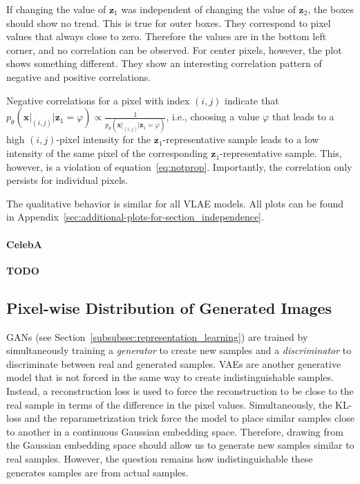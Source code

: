 If changing the value of $\bm{z}_1$ was independent of changing the value of $\bm{z}_2$, the boxes should show no trend.
This is true for outer boxes.
They correspond to pixel values that always close to zero.
Therefore the values are in the bottom left corner, and no correlation can be observed.
For center pixels, however, the plot shows something different.
They show an interesting correlation pattern of negative and positive correlations.

Negative correlations for a pixel with index $(i,j)$ indicate that $p_\theta(\bm{x}\big|_{(i,j)} | \bm{z}_1 = \varphi) \propto \frac{1}{p_\theta(\bm{x}\big|_{(i,j)} | \bm{z}_1 = \varphi)}$, i.e., choosing a value $\varphi$ that leads to a high $(i,j)$-pixel intensity for the $\bm{z}_1$-representative sample leads to a low intensity of the same pixel of the corresponding $\bm{z}_1$-representative sample.
This, however, is a violation of equation~\ref{eq:notprop}.
Importantly, the correlation only persists for individual pixels.

The qualitative behavior is similar for all \ac{VLAE} models.
All plots can be found in Appendix~\ref{sec:additional-plots-for-section_independence}.

\paragraph{CelebA}

\textbf{TODO}

\subsection{Pixel-wise Distribution of Generated Images}\label{subsubsec:pixel_wise_statistics}

\acp{GAN} (see Section~\ref{subsubsec:representation_learning}) are trained by simultaneously training a \textit{generator} to create new samples and a \textit{discriminator} to discriminate between real and generated samples.
\acp{VAE} are another generative model that is not forced in the same way to create indistinguishable samples.
Instead, a reconstruction loss is used to force the reconstruction to be close to the real sample in terms of the difference in the pixel values.
Simultaneously, the \ac{KL}-loss and the reparametrization trick force the model to place similar samples close to another in a continuous Gaussian embedding space.
Therefore, drawing from the Gaussian embedding space should allow us to generate new samples similar to real samples.
However, the question remains how indistinguishable these generates samples are from actual samples.

